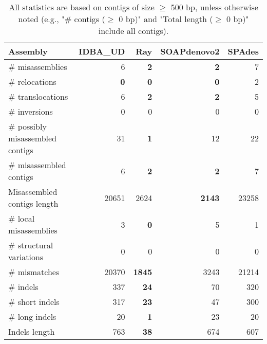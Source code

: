 \documentclass[12pt,a4paper]{article}
\begin{document}
\begin{table}[ht]
\begin{center}
\caption{All statistics are based on contigs of size $\geq$ 500 bp, unless otherwise noted (e.g., "\# contigs ($\geq$ 0 bp)" and "Total length ($\geq$ 0 bp)" include all contigs).}
\begin{tabular}{|l*{4}{|r}|}
\hline
Assembly & IDBA\_UD & Ray & SOAPdenovo2 & SPAdes \\ \hline
\# misassemblies & 6 & {\bf 2} & {\bf 2} & 7 \\ \hline
\hspace{5mm}\# relocations & {\bf 0} & {\bf 0} & {\bf 0} & 2 \\ \hline
\hspace{5mm}\# translocations & 6 & {\bf 2} & {\bf 2} & 5 \\ \hline
\hspace{5mm}\# inversions & 0 & 0 & 0 & 0 \\ \hline
\# possibly misassembled contigs & 31 & {\bf 1} & 12 & 22 \\ \hline
\# misassembled contigs & 6 & {\bf 2} & {\bf 2} & 7 \\ \hline
Misassembled contigs length & 20651 & 2624 & {\bf 2143} & 23258 \\ \hline
\# local misassemblies & 3 & {\bf 0} & 5 & 1 \\ \hline
\# structural variations & 0 & 0 & 0 & 0 \\ \hline
\# mismatches & 20370 & {\bf 1845} & 3243 & 21214 \\ \hline
\# indels & 337 & {\bf 24} & 70 & 320 \\ \hline
\hspace{5mm}\# short indels & 317 & {\bf 23} & 47 & 300 \\ \hline
\hspace{5mm}\# long indels & 20 & {\bf 1} & 23 & 20 \\ \hline
Indels length & 763 & {\bf 38} & 674 & 607 \\ \hline
\end{tabular}
\end{center}
\end{table}
\end{document}
